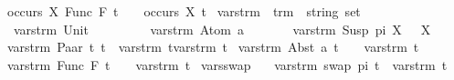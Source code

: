 \begin{isabellebody}
{\isacharbar}{\kern0pt}\ {\isachardoublequoteopen}occurs\ X\ {\isacharparenleft}{\kern0pt}Func\ F\ t{\isacharparenright}{\kern0pt}\ \ \ {\isacharequal}{\kern0pt}\ occurs\ X\ t{\isachardoublequoteclose}\isanewline
\isanewline
{}\isamarkupfalse%
\ vars{\isacharunderscore}{\kern0pt}trm\ {\isacharcolon}{\kern0pt}{\isacharcolon}{\kern0pt}\ {\isachardoublequoteopen}trm\ {\isasymRightarrow}\ string\ set{\isachardoublequoteclose}\isanewline
\ \ \isanewline
\ \ {\isachardoublequoteopen}vars{\isacharunderscore}{\kern0pt}trm\ {\isacharparenleft}{\kern0pt}Unit{\isacharparenright}{\kern0pt}\ \ \ \ \ \ \ {\isacharequal}{\kern0pt}\ {\isacharbraceleft}{\kern0pt}{\isacharbraceright}{\kern0pt}{\isachardoublequoteclose}\isanewline
{\isacharbar}{\kern0pt}\ {\isachardoublequoteopen}vars{\isacharunderscore}{\kern0pt}trm\ {\isacharparenleft}{\kern0pt}Atom\ a{\isacharparenright}{\kern0pt}\ \ \ \ \ {\isacharequal}{\kern0pt}\ {\isacharbraceleft}{\kern0pt}{\isacharbraceright}{\kern0pt}{\isachardoublequoteclose}\isanewline
{\isacharbar}{\kern0pt}\ {\isachardoublequoteopen}vars{\isacharunderscore}{\kern0pt}trm\ {\isacharparenleft}{\kern0pt}Susp\ pi\ X{\isacharparenright}{\kern0pt}\ \ {\isacharequal}{\kern0pt}\ {\isacharbraceleft}{\kern0pt}X{\isacharbraceright}{\kern0pt}{\isachardoublequoteclose}\isanewline
{\isacharbar}{\kern0pt}\ {\isachardoublequoteopen}vars{\isacharunderscore}{\kern0pt}trm\ {\isacharparenleft}{\kern0pt}Paar\ t{}\ t{}{\isacharparenright}{\kern0pt}\ {\isacharequal}{\kern0pt}\ {\isacharparenleft}{\kern0pt}vars{\isacharunderscore}{\kern0pt}trm\ t{}{\isacharparenright}{\kern0pt}{\isasymunion}{\isacharparenleft}{\kern0pt}vars{\isacharunderscore}{\kern0pt}trm\ t{}{\isacharparenright}{\kern0pt}{\isachardoublequoteclose}\isanewline
{\isacharbar}{\kern0pt}\ {\isachardoublequoteopen}vars{\isacharunderscore}{\kern0pt}trm\ {\isacharparenleft}{\kern0pt}Abst\ a\ t{\isacharparenright}{\kern0pt}\ \ \ {\isacharequal}{\kern0pt}\ vars{\isacharunderscore}{\kern0pt}trm\ t{\isachardoublequoteclose}\isanewline
{\isacharbar}{\kern0pt}\ {\isachardoublequoteopen}vars{\isacharunderscore}{\kern0pt}trm\ {\isacharparenleft}{\kern0pt}Func\ F\ t{\isacharparenright}{\kern0pt}\ \ \ {\isacharequal}{\kern0pt}\ vars{\isacharunderscore}{\kern0pt}trm\ t{\isachardoublequoteclose}\isanewline
\isanewline
{}\isamarkupfalse%
\ vars{\isacharunderscore}{\kern0pt}swap{\isacharcolon}{\kern0pt}\isanewline
\ \ \ {\isachardoublequoteopen}vars{\isacharunderscore}{\kern0pt}trm\ {\isacharparenleft}{\kern0pt}swap\ pi\ t{\isacharparenright}{\kern0pt}\ {\isacharequal}{\kern0pt}\ vars{\isacharunderscore}{\kern0pt}trm\ t{\isachardoublequoteclose}\isanewline

\end{isabellebody}
